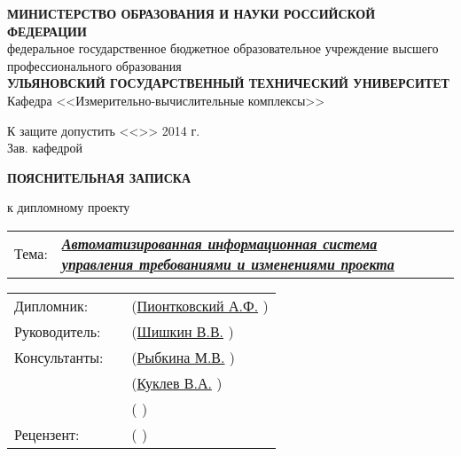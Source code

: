 \begin{titlepage}



\small
\begin{center}

\MakeTextUppercase{\textbf{министерство образования и науки российской федерации}}\\
федеральное государственное бюджетное образовательное учреждение высшего профессионального образования\\
\MakeTextUppercase{\textbf{ульяновский государственный технический университет}}\\[0.7cm]

Кафедра <<Измерительно-вычислительные комплексы>>\\[0.7cm]

\begin{flushright}

К защите допустить <<\underline{\hspace{1cm}}>>\underline{\hspace{2.5cm}} 2014 г.\\
Зав. кафедрой \underline{\hspace{3.5cm}}

\end{flushright}

\vspace{1.5cm}

\LARGE

\textbf{ПОЯСНИТЕЛЬНАЯ ЗАПИСКА}

\Large

к дипломному проекту\\[0.7cm]

\normalsize

\begin{tabular}{p{1cm} p{13.5cm}}
Тема: & \textbf{\textit{\uline{Автоматизированная информационная система управления требованиями и изменениями проекта\hfill}}}
\end{tabular}

\vspace{2cm}

\begin{tabular}{m{3cm} m{6cm} m{5cm}}
    Дипломник:    & \uline{\hfill} & (\uline{Пионтковский А.Ф.\hfill} )  \\[0.5cm]
    Руководитель: & \uline{\hfill} & (\uline{Шишкин В.В.\hfill}       )  \\[0.5cm]
    Консультанты: & \uline{\hfill} & (\uline{Рыбкина М.В.\hfill}      )  \\[0.5cm]
                  & \uline{\hfill} & (\uline{Куклев В.А.\hfill}       )  \\[0.5cm]
                  & \uline{\hfill} & (\uline{\hfill}                  )  \\[0.5cm]
    Рецензент:    & \uline{\hfill} & (\uline{\hfill}                  )  \\
\end{tabular}


\end{center}
\end{titlepage}
